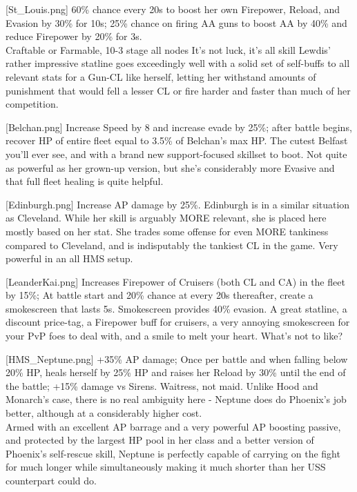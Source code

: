 [St_Louis.png]
{60\% chance every 20s to boost her own Firepower, Reload, and Evasion by 30\% for 10s; 25\% chance on firing AA guns to boost AA by 40\% and reduce Firepower by 20\% for 3s.\\
Craftable or Farmable, 10-3 stage all nodes}
{It's not luck, it's all skill}
{Lewdis' rather impressive statline goes exceedingly well with a solid set of self-buffs to all relevant stats for a Gun-CL like herself, letting her withstand amounts of punishment that would fell a lesser CL or fire harder and faster than much of her competition.}

[Belchan.png]
{Increase Speed by 8 and increase evade by 25\%; after battle begins, recover HP of entire fleet equal to 3.5\% of Belchan's max HP.} 
{}
{The cutest Belfast you'll ever see, and with a brand new support-focused skillset to boot. Not quite as powerful as her grown-up version, but she's considerably more Evasive and that full fleet healing is quite helpful.}

[Edinburgh.png]
{Increase AP damage by 25\%.}
{}
{Edinburgh is in a similar situation as Cleveland. While her skill is arguably MORE relevant, she is placed here mostly based on her stat. She trades some offense for even MORE tankiness compared to Cleveland, and is indisputably the tankiest CL in the game. Very powerful in an all HMS setup.}
 
[LeanderKai.png]
{ Increases Firepower of Cruisers (both CL and CA) in the fleet by 15\%; At battle start and 20\% chance at every 20s thereafter, create a smokescreen that lasts 5s. Smokescreen provides 40\% evasion.}
{}
{A great statline, a discount price-tag, a Firepower buff for cruisers, a very annoying smokescreen for your PvP foes to deal with, and a smile to melt your heart. What's not to like?}
 
[HMS_Neptune.png]
{+35\% AP damage; Once per battle and when falling below 20\% HP, heals herself by 25\% HP and raises her Reload by 30\% until the end of the battle; +15\% damage vs Sirens.}
{Waitress, not maid.}
{Unlike Hood and Monarch's case, there is no real ambiguity here - Neptune does do Phoenix's job better, although at a considerably higher cost.\\
Armed with an excellent AP barrage and a very powerful AP boosting passive, and protected by the largest HP pool in her class and a better version of Phoenix's self-rescue skill, Neptune is perfectly capable of carrying on the fight for much longer while simultaneously making it much shorter than her USS counterpart could do.}

